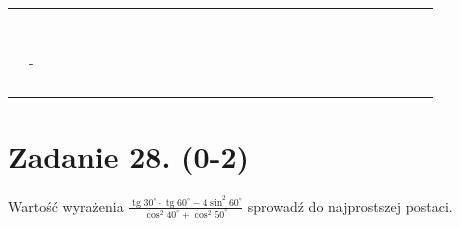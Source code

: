 \documentclass[10pt]{article}
\begin{document}
\begin{center}
\begin{tabular}{|c|c|c|c|c|c|c|c|c|c|c|c|c|c|c|c|c|c|c|c|c|c|c|c|c|c|c|c|c|c|}
\hline
 &  &  &  &  &  &  &  &  &  &  &  &  &  &  &  &  &  &  &  &  &  &  &  &  &  &  &  &  &  \\
\hline
 &  &  &  &  &  &  &  &  &  &  &  &  &  &  &  &  &  &  &  &  &  &  &  &  &  &  &  &  &  \\
\hline
 &  &  &  &  &  &  &  &  &  &  &  &  &  &  &  &  &  &  &  &  &  &  &  &  &  &  &  &  &  \\
\hline
 &  &  &  &  &  &  &  &  &  &  &  &  &  &  &  &  &  &  &  &  &  &  &  &  &  &  &  &  &  \\
\hline
 &  &  &  &  &  &  &  &  &  &  &  &  &  &  &  &  &  &  &  &  &  &  &  &  &  &  &  &  &  \\
\hline
 &  &  &  &  &  &  &  &  &  &  &  &  &  &  &  &  &  &  &  &  &  &  &  &  &  &  &  &  &  \\
\hline
 &  &  &  &  &  &  &  &  &  &  &  &  &  &  &  &  &  &  &  &  &  &  &  &  &  &  &  &  &  \\
\hline
 &  &  &  &  &  &  &  &  &  &  &  &  &  &  &  &  &  &  &  &  &  &  &  &  &  &  &  &  &  \\
\hline
 &  &  &  &  &  &  &  &  &  &  &  &  &  &  &  &  &  &  &  &  &  &  &  &  &  &  &  &  &  \\
\hline
 & - &  &  &  &  &  &  &  &  &  &  &  &  &  &  &  &  &  &  &  &  &  &  &  &  &  &  &  &  \\
\hline
 &  &  &  &  &  &  &  &  &  &  &  &  &  &  &  &  &  &  &  &  &  &  &  &  &  &  &  &  &  \\
\hline
 &  &  &  &  &  &  &  &  &  &  &  &  &  &  &  &  &  &  &  &  &  &  &  &  &  &  &  &  &  \\
\hline
 &  &  &  &  &  &  &  &  &  &  &  &  &  &  &  &  &  &  &  &  &  &  &  &  &  &  &  &  &  \\
\hline
 &  &  &  &  &  &  &  &  &  &  &  &  &  &  &  &  &  &  &  &  &  &  &  &  &  &  &  &  &  \\
\hline
\end{tabular}
\end{center}

\section*{Zadanie 28. (0-2)}
Wartość wyrażenia \(\frac{\operatorname{tg} 30^{\circ} \cdot \operatorname{tg} 60^{\circ}-4 \sin ^{2} 60^{\circ}}{\cos ^{2} 40^{\circ}+\cos ^{2} 50^{\circ}}\) sprowadź do najprostszej postaci.
\end{document}
